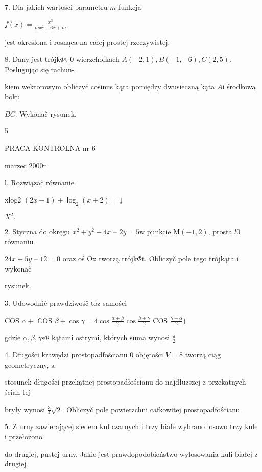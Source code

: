 \documentclass[a4paper,12pt]{article}
\begin{document}
7. Dla jakich wartości parametru $m$ funkcja

$f(x)=\displaystyle \frac{x^{3}}{mx^{2}+6x+m}$

jest określona $\mathrm{i}$ rosnąca na całej prostej rzeczywistej.

8. Dany jest trójk$\Phi$t $0$ wierzchofkach $A(-2,1), B(-1,-6), C(2,5)$. Poslugując się rachun-

kiem wektorowym obliczyč cosinus kąta pomiędzy dwusieczną kąta $A\mathrm{i}$ środkową boku

$\overline{BC}$. Wykonač rysunek.

5





PRACA KONTROLNA nr 6

marzec 2000r

l. Rozwiązač równanie

xlog2 $(2x-1)+\log_{2}(x+2) =\underline{1}$

$X^{2}.$

2. Styczna do okręgu $x^{2}+y^{2}-4x$ -- $2y = 5\mathrm{w}$ punkcie $\mathrm{M}(-1,2)$, prosta $l0$ równaniu

$24x+5y$ -- $12 =0$ oraz oś Ox tworzą trójk$\Phi$t. Obliczyč pole tego trójkąta $\mathrm{i}$ wykonač

rysunek.

3. Udowodnič prawdziwośč $\mathrm{t}\mathrm{o}\dot{\mathrm{z}}$ samości

COS $\alpha+$ COS $\displaystyle \beta+\cos\gamma=4\cos\frac{\alpha+\beta}{2}\cos\frac{\beta+\gamma}{2}$ COS $\displaystyle \frac{\gamma+\alpha}{2}$)

gdzie $\alpha, \beta, \gamma \mathrm{s}\Phi$ kątami ostrymi, których suma wynosi $\displaystyle \frac{\pi}{2}$

4. Dfugości krawędzi prostopadfościanu $0$ objętości $V = 8$ tworzą ciąg geometryczny, $\mathrm{a}$

stosunek długości przekątnej prostopadłościanu do najdłuzszej $\mathrm{z}$ przekątnych ścian tej

bryły wynosi $\displaystyle \frac{3}{4}\sqrt{2}$. Obliczyč pole powierzchni cafkowitej prostopadfościanu.

5. $\mathrm{Z}$ urny zawierającej siedem kul czarnych $\mathrm{i}$ trzy biafe wybrano losowo trzy kule $\mathrm{i}$ przełozono

do drugiej, pustej urny. Jakie jest prawdopodobieństwo wylosowania kuli białej $\mathrm{z}$ drugiej
\end{document}
